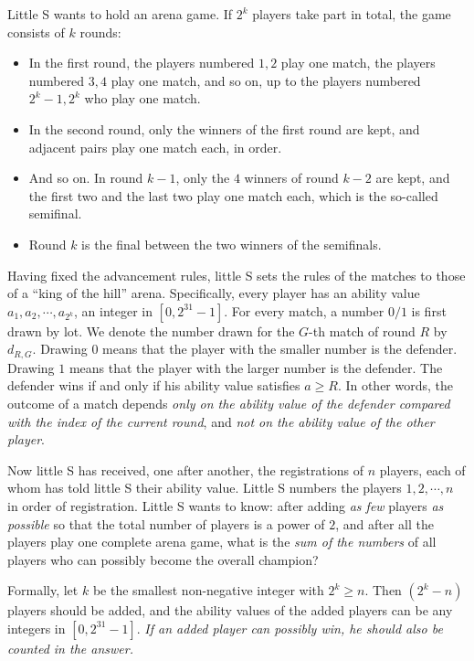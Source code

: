 \documentclass[11pt]{article}
\begin{document}
Little S wants to hold an arena game.
If $2^k$ players take part in total, the game consists of $k$ rounds:
\begin{itemize}
\item In the first round, the players numbered $1, 2$ play one match, the
players numbered $3, 4$ play one match, and so on, up to the players
numbered $2^k - 1, 2^k$ who play one match.
\item In the second round, only the winners of the first round are kept,
and adjacent pairs play one match each, in order.
\item And so on.
In round $k - 1$, only the $4$ winners of round $k - 2$ are kept, and the
first two and the last two play one match each, which is the so-called
semifinal.
\item Round $k$ is the final between the two winners of the semifinals.
\end{itemize}

Having fixed the advancement rules, little S sets the rules of the matches
to those of a ``king of the hill'' arena.
Specifically, every player has an ability value $a_1, a_2, \cdots, a_{2^k}$,
an integer in $[0, 2^{31} - 1]$.
For every match, a number $0/1$ is first drawn by lot.
We denote the number drawn for the $G$-th match of round $R$ by $d_{R,G}$.
Drawing $0$ means that the player with the smaller number is the
defender.
Drawing $1$ means that the player with the larger number is the defender.
The defender wins if and only if his ability value satisfies $a \ge R$.
In other words, the outcome of a match depends \emph{only on the ability
value of the defender compared with the index of the current round}, and
\emph{not on the ability value of the other player}.

Now little S has received, one after another, the registrations of $n$
players, each of whom has told little S their ability value.
Little S numbers the players $1, 2, \cdots, n$ in order of registration.
Little S wants to know: after adding \emph{as few} players \emph{as
possible} so that the total number of players is a power of $2$, and after
all the players play one complete arena game, what is the \emph{sum of the
numbers} of all players who can possibly become the overall champion?

Formally, let $k$ be the smallest non-negative integer with $2^k \ge n$.
Then $(2^k - n)$ players should be added, and the ability values of the
added players can be any integers in $[0, 2^{31} - 1]$.
\emph{If an added player can possibly win, he should also be counted in the
answer.}
\end{document}
